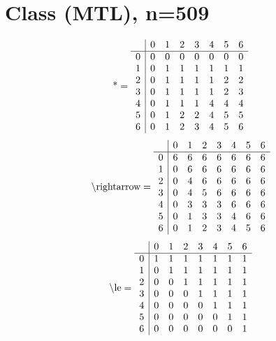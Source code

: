 \documentclass[11pt]{article}
\begin{document}
\section{Class (MTL), n=509}
\[\text{*} = 
\begin{array}{r | r r r r r r r}
 & 0 & 1 & 2 & 3 & 4 & 5 & 6 \\ \hline
0 & 0 & 0 & 0 & 0 & 0 & 0 & 0 \\
1 & 0 & 1 & 1 & 1 & 1 & 1 & 1 \\
2 & 0 & 1 & 1 & 1 & 1 & 2 & 2 \\
3 & 0 & 1 & 1 & 1 & 1 & 2 & 3 \\
4 & 0 & 1 & 1 & 1 & 4 & 4 & 4 \\
5 & 0 & 1 & 2 & 2 & 4 & 5 & 5 \\
6 & 0 & 1 & 2 & 3 & 4 & 5 & 6 \\
\end{array}
\]
\[\text{\textbackslash rightarrow} = 
\begin{array}{r | r r r r r r r}
 & 0 & 1 & 2 & 3 & 4 & 5 & 6 \\ \hline
0 & 6 & 6 & 6 & 6 & 6 & 6 & 6 \\
1 & 0 & 6 & 6 & 6 & 6 & 6 & 6 \\
2 & 0 & 4 & 6 & 6 & 6 & 6 & 6 \\
3 & 0 & 4 & 5 & 6 & 6 & 6 & 6 \\
4 & 0 & 3 & 3 & 3 & 6 & 6 & 6 \\
5 & 0 & 1 & 3 & 3 & 4 & 6 & 6 \\
6 & 0 & 1 & 2 & 3 & 4 & 5 & 6 \\
\end{array}
\]
\[\text{\textbackslash le} = 
\begin{array}{r | r r r r r r r}
 & 0 & 1 & 2 & 3 & 4 & 5 & 6 \\ \hline
0 & 1 & 1 & 1 & 1 & 1 & 1 & 1 \\
1 & 0 & 1 & 1 & 1 & 1 & 1 & 1 \\
2 & 0 & 0 & 1 & 1 & 1 & 1 & 1 \\
3 & 0 & 0 & 0 & 1 & 1 & 1 & 1 \\
4 & 0 & 0 & 0 & 0 & 1 & 1 & 1 \\
5 & 0 & 0 & 0 & 0 & 0 & 1 & 1 \\
6 & 0 & 0 & 0 & 0 & 0 & 0 & 1 \\
\end{array}
\]
\end{document}
